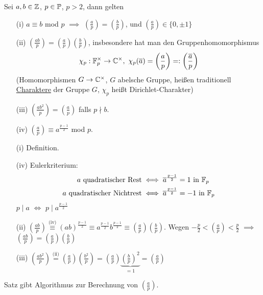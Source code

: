 \documentclass[a4paper,DIV15,BCOR12mm]{article}
\begin{document}
\begin{satz}
Sei $a,b\in\mathbb{Z}$, $p \in \mathbb{P}$, $p>2$, dann gelten
\begin{enumerate}
\item[(i)] $a \equiv b$ mod $p$ $\implies$ $\left(\frac{a}{p}\right) = \left(\frac{b}{p}\right)$, und $\left(\frac{a}{p}\right) \in \{0,\pm 1\}$
\item[(ii)] $\left(\frac{ab}{p}\right) = \left(\frac{a}{p}\right)\left(\frac{b}{p}\right)$, insbesondere hat man den Gruppenhomomorphismus
\[
 \chi_p : \MdF_p^\times \to \MdC^\times,\ \chi_p(\overline a) =
\left(\frac{a}{p}\right) =: \left(\frac{\overline a}{p}\right)
\]
(Homomorphismen $G \to \mathbb{C}^\times$, $G$ abelsche Gruppe, heißen
traditionell \underline{Charaktere} der Gruppe $G$, $\chi_p$ heißt
Dirichlet-Charakter)
\item[(iii)] $\left(\frac{ab^2}{p}\right)=\left(\frac{a}{p}\right)$ falls $p \nmid b$.
\item[(iv)] $\left(\frac{a}{p}\right) \equiv a^{\frac{p-1}{2}}$ mod $p$.
\end{enumerate}
\end{satz}
\begin{beweis}
\begin{enumerate}
\item[(i)] Definition.
\item[(iv)]
Eulerkriterium:
    \begin{align*} a \text{ quadratischer Rest} & \iff \overline a ^{\frac{p-1}{2}} = 1 \text{ in } \mathbb{F}_p \\
                a \text{ quadratischer Nichtrest} & \iff  \overline a ^{\frac{p-1}{2}} = -1 \text{ in } \mathbb{F}_p
    \end{align*}
    $p \mid a$ $\iff$ $p \mid a^\frac{p-1}{2}$
\item[(ii)] $\left(\frac{ab}{p}\right) \stackrel{\mbox{(iv)}}{\equiv}(ab)^\frac{p-1}{2}\equiv a^\frac{p-1}{2} b^\frac{p-1}{2} \equiv \left(\frac{a}{p}\right)\left(\frac{b}{p}\right)$. Wegen $-\frac{p}{2}<\left(\frac{a}{p}\right)<\frac{p}{2}$ $\implies$ $\left(\frac{ab}{p}\right)=\left(\frac{a}{p}\right)\left(\frac{b}{p}\right)$
\item[(iii)] $\left(\frac{ab^2}{p}\right)\stackrel{\mbox{(ii)}}{=}\left(\frac{a}{p}\right)\left(\frac{b^2}{p}\right)=\left(\frac{a}{p}\right)\underbrace{\left(\frac{b}{p}\right)^2}_{=1}=\left(\frac{a}{p}\right)$
\end{enumerate}
\end{beweis}
Satz gibt Algorithmus zur Berechnung von $\left(\frac{a}{p}\right)$.
\end{document}
